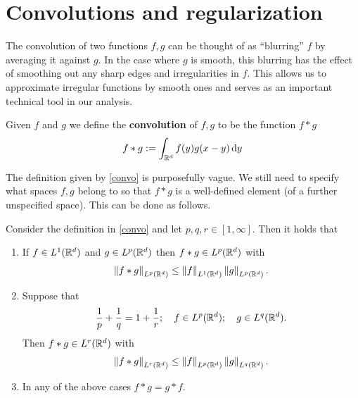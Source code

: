 \documentclass[
    a4paper,
    DIV=14,
    abstract=true,
    numbers=noenddot
]{scrartcl}
\begin{document}
\appendix
\section{Convolutions and regularization}
The convolution of two functions $f,g$ can be thought of as ``blurring''  $f$ by averaging it against $g$. In the case where  $g$ is smooth, this blurring has the effect of smoothing out any sharp edges and irregularities in  $f$. This allows us to approximate irregular functions by smooth ones and serves as an important technical tool in our analysis.

\begin{definition}
	Given $f$ and $g$ we define the \textbf{convolution} of $f,g$ to be
	the function $f *g $
	\begin{align}\label{convo}
		f *g := \int_{\mathbb{R}^d} f(y)g(x-y) \,\mathrm{d} y
	\end{align}
\end{definition}
The definition given by \eqref{convo} is purposefully vague. We still need to specify what spaces $f,g$ belong to so that  $f*g$ is a well-defined element (of a further unspecified space). This can be done as follows.
\begin{proposition}\label{Young}
	Consider the definition in \eqref{convo} and let $p,q,r \in  [1, \infty]$. Then it holds that
	\begin{enumerate}
		\item If $f \in L^1(\mathbb{R}^d)$ and $g \in L^p(\mathbb{R}^d)$ then $f*g \in L^p(\mathbb{R}^d)$ with
		      \begin{align*}
			      \left\lVert f*g \right\rVert_{L^p(\mathbb{R}^d)}\leq \left\lVert f \right\rVert_{L^1(\mathbb{R}^d)}\left\lVert g \right\rVert_{L^p(\mathbb{R}^d)}.
		      \end{align*}
		\item  Suppose that
		      \begin{align*}
			      \frac{1}{p}+\frac{1}{q}=1+\frac{1}{r}; \quad f \in L^p(\mathbb{R}^d); \quad g \in L^q(\mathbb{R}^d)    .
		      \end{align*}
		      Then $f*g \in L^r(\mathbb{R}^d)$ with
		      \begin{align*}
			      \left\lVert f*g \right\rVert_{L^r(\mathbb{R}^d)}\leq \left\lVert f \right\rVert_{L^p(\mathbb{R}^d)}\left\lVert g \right\rVert_{L^q(\mathbb{R}^d)}.
		      \end{align*}
\item In any of the above cases $f*g=g*f$.
	\end{enumerate}

\end{proposition}
\end{document}
